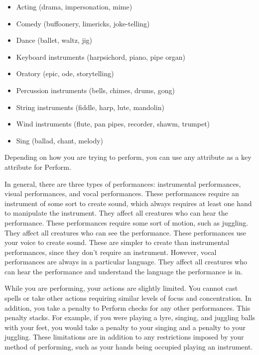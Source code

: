         \begin{itemize}
            \item Acting (drama, impersonation, mime)
            \item Comedy (buffoonery, limericks, joke-telling)
            \item Dance (ballet, waltz, jig)
            \item Keyboard instruments (harpsichord, piano, pipe organ)
            \item Oratory (epic, ode, storytelling)
            \item Percussion instruments (bells, chimes, drums, gong)
            \item String instruments (fiddle, harp, lute, mandolin)
            \item Wind instruments (flute, pan pipes, recorder, shawm, trumpet)
            \item Sing (ballad, chant, melody)
        \end{itemize}

        Depending on how you are trying to perform, you can use any attribute as a key attribute for Perform.

        In general, there are three types of performances: instrumental performances, visual performances, and vocal performances.
         These performances require an instrument of some sort to create sound, which always requires at least one hand to manipulate the instrument.
        They affect all creatures who can hear the performance.
         These performances require some sort of motion, such as juggling.
        They affect all creatures who can see the performance.
         These performances use your voice to create sound.
        These are simpler to create than instrumental performances, since they don't require an instrument.
        However, vocal performances are always in a particular language.
        They affect all creatures who can hear the performance and understand the language the performance is in.

        While you are performing, your actions are slightly limited.
        You cannot cast spells or take other actions requiring similar levels of focus and concentration.
        In addition, you take a  penalty to Perform checks for any other performances.
        This penalty stacks.
        For example, if you were playing a lyre, singing, and juggling balls with your feet, you would take a  penalty to your singing and a  penalty to your juggling.
        These limitations are in addition to any restrictions imposed by your method of performing, such as your hands being occupied playing an instrument.

